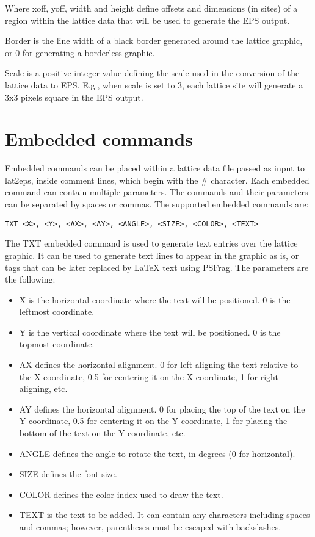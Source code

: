 \documentclass[a4paper]{article}
\begin{document}
Where xoff, yoff, width and height define offsets and dimensions (in sites) of a region within the lattice data that will be used to generate the EPS output.\bigbreak

Border is the line width of a black border generated around the lattice graphic, or 0 for generating a borderless graphic.\bigbreak

Scale is a positive integer value defining the scale used in the conversion of the lattice data to EPS. E.g., when scale is set to 3, each lattice site will generate a 3x3 pixels square in the EPS output.\bigbreak


\section{Embedded commands}
\bigbreak

Embedded commands can be placed within a lattice data file passed as input to lat2eps, inside comment lines, which begin with the \# character. Each embedded command can contain multiple parameters. The commands and their parameters can be separated by spaces or commas. The supported embedded commands are:

\bigbreak
\texttt{TXT <X>, <Y>, <AX>, <AY>, <ANGLE>, <SIZE>, <COLOR>, <TEXT>}\bigbreak

The TXT embedded command is used to generate text entries over the lattice graphic. It can be used to generate text lines to appear in the graphic as is, or tags that can be later replaced by LaTeX text using PSFrag. The parameters are the following:

\begin{itemize}
  \item X is the horizontal coordinate where the text will be positioned. 0 is the leftmost coordinate.
  \item Y is the vertical coordinate where the text will be positioned. 0 is the topmost coordinate.
  \item AX defines the horizontal alignment. 0 for left-aligning the text relative to the X coordinate, 0.5 for centering it on the X coordinate, 1 for right-aligning, etc.
  \item AY defines the horizontal alignment. 0 for placing the top of the text on the Y coordinate, 0.5 for centering it on the Y coordinate, 1 for placing the bottom of the text on the Y coordinate, etc.
  \item ANGLE defines the angle to rotate the text, in degrees (0 for horizontal).
  \item SIZE defines the font size.
  \item COLOR defines the color index used to draw the text.
  \item TEXT is the text to be added. It can contain any characters including spaces and commas; however, parentheses must be escaped with backslashes.
\end{itemize} 
\bigbreak\bigbreak
\end{document}

